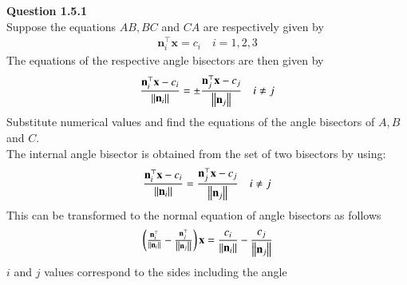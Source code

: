 \documentclass[journal,12pt,twocolumn]{IEEEtran}
\begin{document}
\let\vec\mathbf




\vspace{3cm}

\textbf{Question 1.5.1}\\
Suppose the equations $AB, BC$ and $CA$ are respectively given by 
		\begin{align}
			\label{eq:tri-sides}
			\vec{n}_i^{\top}\vec{x}=c_i \quad i = 1, 2, 3 
		\end{align}
		The equations of the respective angle bisectors are then given by 
		\begin{align}
			\frac{\vec{n}_i^{\top}\vec{x}-c_i}{\norm{\vec{n}_i}}
		=
	\pm	\frac{\vec{n}_j^{\top}\vec{x}-c_j}{\norm{\vec{n}_j}}
\quad i \ne j
		\end{align}
		Substitute numerical values and find the equations of the angle bisectors of $A, B$ and $C$.\\
\solution 
The internal angle bisector is obtained from the set of two bisectors by using:
		\begin{align}
			\frac{\vec{n}_i^{\top}\vec{x}-c_i}{\norm{\vec{n}_i}}
		=
		\frac{\vec{n}_j^{\top}\vec{x}-c_j}{\norm{\vec{n}_j}}
\quad i \ne j	
\end{align}
This can be transformed to the normal equation of angle bisectors as follows 
\begin{align}
       \myvec{\frac{\vec{n}_i^{\top}}{\norm{\vec{n}_i}} - \frac{\vec{n}_j^{\top}}{\norm{\vec{n}_j}}}\vec{x}
       =
       \frac{c_i}{\norm{\vec{n}_i}}-\frac{c_j}{\norm{\vec{n}_j}}
\end{align}
$i$ and $j$ values correspond to the sides including the angle\\
\end{document}
